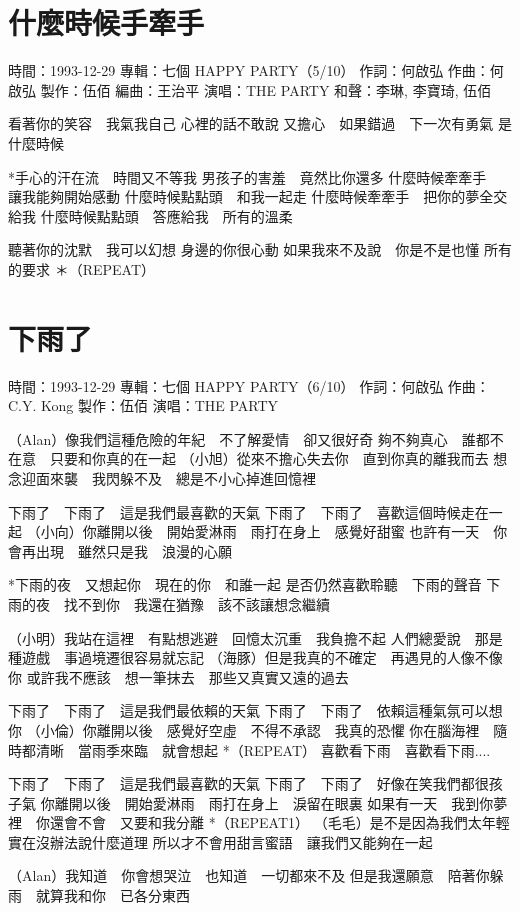 \documentclass[UTF8,a4paper,oneside,twocolumn,12pt]{ctexbook}
\newcommand{\infopair}[2]{\textbullet #1：#2}
\newcommand{\zc}[1][伍佰]{\infopair{作詞}{#1}}
\newcommand{\zq}[1][伍佰]{\infopair{作曲}{#1}}
\newcommand{\bq}[1][伍佰]{\infopair{編曲}{#1}}
\newcommand{\zj}[1]{\infopair{專輯}{#1}}
\newcommand{\zz}[1]{\infopair{製作}{#1}}
\newcommand{\sj}[1]{\infopair{時間}{#1}}
\newenvironment{info}{\begin{flushleft}\kaishu
	}
	{\end{flushleft}\normalsize\yahei\par}
\newenvironment{lyric}{
	}
{}
\begin{document}
\section{什麼時候手牽手}
\begin{info}
	\sj{1993-12-29}
	\zj{七個 HAPPY PARTY（5/10）}
	\zc[何啟弘]
	\zq[何啟弘]
	\zz{伍佰}
	\bq[王治平]
	\infopair{演唱}{THE PARTY}
	\infopair{和聲}{李琳, 李寶琦, 伍佰}
\end{info}
\begin{lyric}
	看著你的笑容　我氣我自己
	心裡的話不敢說
	又擔心　如果錯過　下一次有勇氣
	是什麼時候

	*手心的汗在流　時間又不等我
	男孩子的害羞　竟然比你還多
	什麼時候牽牽手　讓我能夠開始感動
	什麼時候點點頭　和我一起走
	什麼時候牽牽手　把你的夢全交給我
	什麼時候點點頭　答應給我　所有的溫柔

	聽著你的沈默　我可以幻想
	身邊的你很心動
	如果我來不及說　你是不是也懂
	所有的要求
	＊（REPEAT）
\end{lyric}

\section{下雨了}
\begin{info}
	\sj{1993-12-29}
	\zj{七個 HAPPY PARTY（6/10）}
	\zc[何啟弘]
	\zq[C.Y. Kong]
	\zz{伍佰}
	\infopair{演唱}{THE PARTY}
\end{info}
\begin{lyric}
	（Alan）像我們這種危險的年紀　不了解愛情　卻又很好奇
	夠不夠真心　誰都不在意　只要和你真的在一起
	（小旭）從來不擔心失去你　直到你真的離我而去
	想念迎面來襲　我閃躲不及　總是不小心掉進回憶裡

	下雨了　下雨了　這是我們最喜歡的天氣
	下雨了　下雨了　喜歡這個時候走在一起
	（小向）你離開以後　開始愛淋雨　雨打在身上　感覺好甜蜜
	也許有一天　你會再出現　雖然只是我　浪漫的心願

	*下雨的夜　又想起你　現在的你　和誰一起
	是否仍然喜歡聆聽　下雨的聲音
	下雨的夜　找不到你　我還在猶豫　該不該讓想念繼續

	（小明）我站在這裡　有點想逃避　回憶太沉重　我負擔不起
	人們總愛說　那是種遊戲　事過境遷很容易就忘記
	（海豚）但是我真的不確定　再遇見的人像不像你
	或許我不應該　想一筆抹去　那些又真實又遠的過去

	下雨了　下雨了　這是我們最依賴的天氣
	下雨了　下雨了　依賴這種氣氛可以想你
	（小倫）你離開以後　感覺好空虛　不得不承認　我真的恐懼
	你在腦海裡　隨時都清晰　當雨季來臨　就會想起
	*（REPEAT）
	喜歡看下雨　喜歡看下雨....

	下雨了　下雨了　這是我們最喜歡的天氣
	下雨了　下雨了　好像在笑我們都很孩子氣
	你離開以後　開始愛淋雨　雨打在身上　淚留在眼裏
	如果有一天　我到你夢裡　你還會不會　又要和我分離
	*（REPEAT1）
	（毛毛）是不是因為我們太年輕　實在沒辦法說什麼道理
	所以才不會用甜言蜜語　讓我們又能夠在一起

	（Alan）我知道　你會想哭泣　也知道　一切都來不及
	但是我還願意　陪著你躲雨　就算我和你　已各分東西
\end{lyric}
\end{document}
